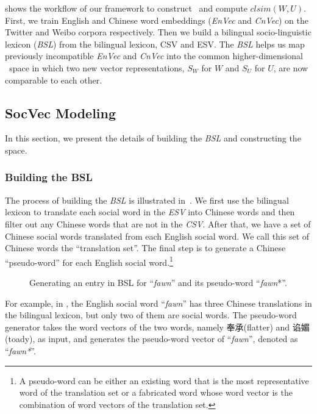  shows the workflow of our framework to construct \textit{\socvec}~and compute $clsim(W,U)$. First, we train English and 
Chinese word embeddings (\textit{EnVec} and \textit{CnVec}) 
on the Twitter and Weibo corpora respectively. Then 
we build a bilingual socio-linguistic lexicon (\textit{BSL}) 
from the bilingual lexicon, CSV and ESV. 
The \textit{BSL} helps us 
map previously incompatible \textit{EnVec} and \textit{CnVec} 
into the common higher-dimensional \textit{\socvec~}space in which
two new vector representations, $S_W$ for $W$ and $S_U$ for $U$,
are now comparable to each other. 

\subsection{SocVec Modeling}
\label{sec:model}
In this section, we present the details of building the \textit{BSL} 
and constructing the \textit{\socvec} space.

\subsubsection{Building the BSL}
The process of building the \textit{BSL} is 
illustrated in~. 
We first use the bilingual lexicon to translate each social word 
in the \textit{ESV} into Chinese words and then filter out any Chinese words 
that are not in the \textit{CSV}. After that, we have a set of 
Chinese social words translated from each English social word. 
We call this set of Chinese words the ``translation set''.
The final step is to generate a Chinese ``pseudo-word'' 
for each English social word.\footnote{A pseudo-word can be either 
an existing word that is the most representative word of the translation set 
or a fabricated word whose word vector is the combination of word vectors of
the translation set.}

\begin{figure}[th]
	\centering
	\caption{Generating an entry in BSL for ``\textit{fawn}'' 
		and its pseudo-word ``\textit{fawn}*''.}
	\label{fig:BSL}
\end{figure}

For example, in , the
English social word ``\textit{fawn}'' has three Chinese translations in the 
bilingual lexicon, but only two of them are social words. 
The pseudo-word generator takes the word vectors of the two words, namely
奉承(flatter) and 谄媚(toady), as input, and generates the pseudo-word 
vector of ``\textit{fawn}'', denoted as ``\textit{fawn*}''. 

